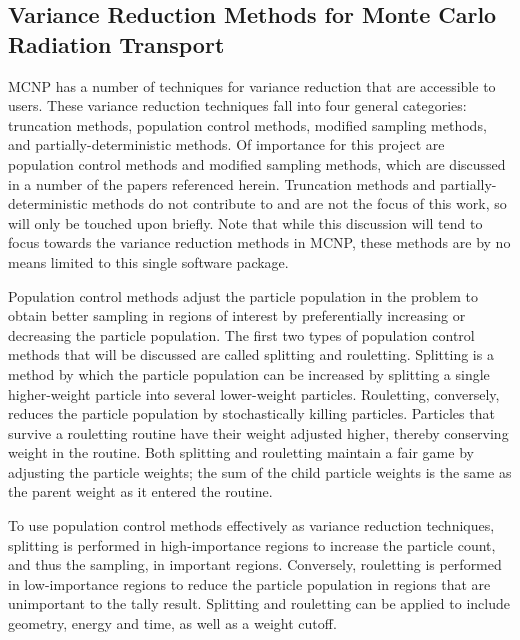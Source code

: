 \subsection{Variance Reduction Methods for Monte Carlo Radiation Transport}
\label{subsec:MCVR}
MCNP \cite{hendricks_mcnp_1985, brown_mcnp_2002, mcnp_manual_v1}
has a number of techniques for variance
reduction that are accessible to users. These variance reduction
techniques fall
into four general categories: truncation methods, population control methods, modified
sampling methods, and partially-deterministic methods. Of importance for this
project are
population control methods and modified sampling methods, which are discussed in
a number
of the papers referenced herein. Truncation methods and partially-deterministic
methods do not contribute to and are not the focus of this work,
so will only be touched upon briefly. Note that while this
discussion will tend to focus towards the variance reduction methods in MCNP,
these
methods are by no means limited to this single software package. %

Population control methods adjust the particle population in the problem to
obtain better sampling in regions of interest by preferentially increasing or
decreasing the particle population.
The first two types of population control methods that will be discussed
are called splitting and rouletting.
Splitting is a method by which the particle population can be increased by
splitting a single higher-weight particle into several lower-weight particles.
Rouletting, conversely, reduces the particle population by stochastically
killing particles. Particles that survive a rouletting routine have their weight
adjusted higher, thereby conserving weight in the routine.
Both splitting and rouletting maintain a
fair game by adjusting the particle weights; the sum of the child particle weights is the same as the parent
weight as it entered the routine. 

To use population control methods effectively as variance reduction techniques,
splitting is performed in high-importance regions to increase the particle
count, and thus the sampling, in important regions. Conversely, rouletting is
performed in
 low-importance
  regions to reduce the particle population in regions that are unimportant to
  the tally result.
Splitting and rouletting can be applied to include geometry, energy and time,
  as well as a weight cutoff.

